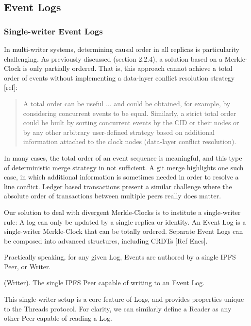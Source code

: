 \documentclass{comjnl}
\begin{document}
\subsection{ Event Logs}

\subsubsection{Single-writer Event Logs}

In multi-writer systems, determining causal order in all replicas is particularity challenging. As previously discussed (section 2.2.4), a solution based on a Merkle-Clock is only partially ordered. That is, this approach cannot achieve a total order of events without implementing a data-layer conflict resolution strategy [ref]:


\begin{quote}
	A total order can be useful ... and could be obtained, for example, by considering concurrent events to be equal. Similarly, a strict total order could be built by sorting concurrent events by the CID or their nodes or by any other arbitrary user-defined strategy based on additional information attached to the clock nodes (data-layer conflict resolution).
\end{quote}

In many cases, the total order of an event sequence is meaningful, and this type of deterministic merge strategy in not sufficient. A git merge highlights one such case, in which additional information is sometimes needed in order to resolve a line conflict. Ledger based transactions present a similar challenge where the absolute order of transactions between multiple peers really does matter.

Our solution to deal with divergent Merkle-Clocks is to institute a single-writer rule: A log can only be updated by a single replica or identity. An Event Log is a single-writer Merkle-Clock that can be totally ordered. Separate Event Logs can be composed into advanced structures, including CRDTs [Ref Enes].

Practically speaking, for any given Log, Events are authored by a single IPFS Peer, or Writer.

\begin{definition}
(Writer). The single IPFS Peer capable of writing to an Event Log.
\end{definition}

This single-writer setup is a core feature of Logs, and provides properties unique to the Threads protocol. For clarity, we can similarly define a Reader as any other Peer capable of reading a Log.
\end{document}
